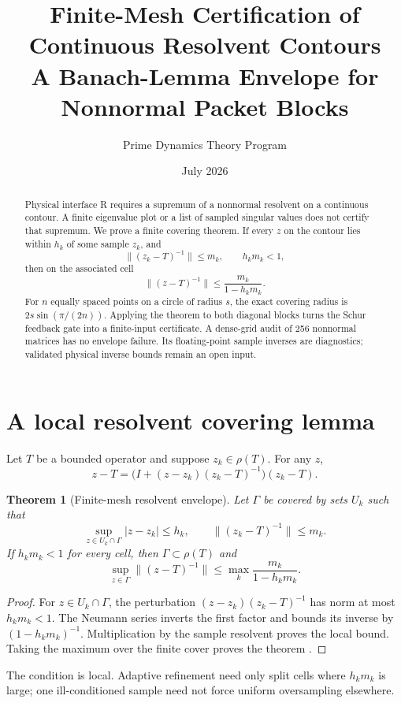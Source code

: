 \documentclass[12pt]{article}
\title{Finite-Mesh Certification of Continuous Resolvent Contours\\\large A Banach-Lemma Envelope for Nonnormal Packet Blocks}
\author{Prime Dynamics Theory Program}
\date{July 2026}
\newtheorem{theorem}{Theorem}
\newcommand{\norm}[1]{\lVert#1\rVert}
\begin{document}
\maketitle
\begin{abstract}
Physical interface R requires a supremum of a nonnormal resolvent on a
continuous contour.  A finite eigenvalue plot or a list of sampled singular
values does not certify that supremum.  We prove a finite covering theorem.
If every $z$ on the contour lies within $h_k$ of some sample $z_k$, and
\[
 \norm{(z_k-T)^{-1}}\le m_k,\qquad h_km_k<1,
\]
then on the associated cell
\[
 \norm{(z-T)^{-1}}\le\frac{m_k}{1-h_km_k}.
\]
For $n$ equally spaced points on a circle of radius $s$, the exact covering
radius is $2s\sin(\pi/(2n))$.  Applying the theorem to both diagonal blocks
turns the Schur feedback gate into a finite-input certificate.  A dense-grid
audit of 256 nonnormal matrices has no envelope failure.  Its floating-point
sample inverses are diagnostics; validated physical inverse bounds remain an
open input.
\end{abstract}

\section{A local resolvent covering lemma}
Let $T$ be a bounded operator and suppose $z_k\in\rho(T)$.  For any $z$,
\[
 z-T=\bigl(I+(z-z_k)(z_k-T)^{-1}\bigr)(z_k-T).
\]

\begin{theorem}[Finite-mesh resolvent envelope]\label{thm:mesh}
Let $\Gamma$ be covered by sets $U_k$ such that
\[
 \sup_{z\in U_k\cap\Gamma}|z-z_k|\le h_k,
 \qquad\norm{(z_k-T)^{-1}}\le m_k.
\]
If $h_km_k<1$ for every cell, then $\Gamma\subset\rho(T)$ and
\[
 \sup_{z\in\Gamma}\norm{(z-T)^{-1}}
 \le\max_k\frac{m_k}{1-h_km_k}.
\]
\end{theorem}
\begin{proof}
For $z\in U_k\cap\Gamma$, the perturbation
$(z-z_k)(z_k-T)^{-1}$ has norm at most $h_km_k<1$.  The Neumann series
inverts the first factor and bounds its inverse by $(1-h_km_k)^{-1}$.
Multiplication by the sample resolvent proves the local bound.  Taking the
maximum over the finite cover proves the theorem \citep{Kato1995}.
\end{proof}

The condition is local.  Adaptive refinement need only split cells where
$h_km_k$ is large; one ill-conditioned sample need not force uniform
oversampling elsewhere.
\end{document}
